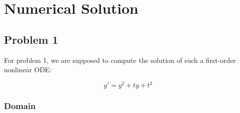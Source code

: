 \documentclass[a4paper]{article}
\begin{document}
	
	
	
	
	
	
	
	
	\section{Numerical Solution}
	
	\subsection{Problem 1}
	
	For problem 1, we are supposed to compute the solution of such a first-order nonlinear ODE: 
	
	\begin{equation} \label{eq:ode1}
		y' = y^2 + ty + t^2 \tag{ODE1}
	\end{equation}
	
	\subsubsection{Domain}
	
\end{document}
